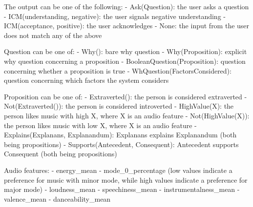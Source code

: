 \begin{listing}
The output can be one of the following:
- Ask(Question): the user asks a question
- ICM(understanding, negative): the user signals negative understanding
- ICM(acceptance, positive): the user acknowledges
- None: the input from the user does not match any of the above

Question can be one of:
- Why(): bare why question
- Why(Proposition): explicit why question concerning a proposition
- BooleanQuestion(Proposition): question concerning whether a proposition is true
- WhQuestion(FactorsConsidered): question concerning which factors the system considers

Proposition can be one of:
- Extraverted(): the person is considered extraverted
- Not(Extraverted()): the person is considered introverted
- HighValue(X): the person likes music with high X, where X is an audio feature
- Not(HighValue(X)): the person likes music with low X, where X is an audio feature
- Explains(Explanans, Explanandum): Explanans explains Explanandum (both being propositions)
- Supports(Antecedent, Consequent): Antecedent supports Consequent (both being propositions)

Audio features:
- energy_mean
- mode_0_percentage (low values indicate a preference for music with minor mode, while high values indicate a preference for major mode)
- loudness_mean
- speechiness_mean
- instrumentalness_mean
- valence_mean
- danceability_mean
\end{listing}
